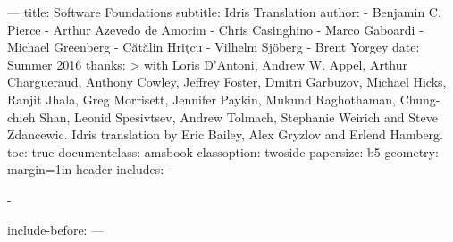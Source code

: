 ---
title: Software Foundations
subtitle: Idris Translation
author:
- Benjamin C. Pierce
- Arthur Azevedo de Amorim
- Chris Casinghino
- Marco Gaboardi
- Michael Greenberg
- Cătălin Hriţcu
- Vilhelm Sjöberg
- Brent Yorgey
date: Summer 2016
thanks: >
  with Loris D'Antoni, Andrew W. Appel, Arthur Chargueraud, Anthony Cowley,
  Jeffrey Foster, Dmitri Garbuzov, Michael Hicks, Ranjit Jhala, Greg Morrisett,
  Jennifer Paykin, Mukund Raghothaman, Chung-chieh Shan, Leonid Spesivtsev,
  Andrew Tolmach, Stephanie Weirich and Steve Zdancewic.\newline\newline
  Idris translation by Eric Bailey, Alex Gryzlov and Erlend Hamberg.
toc: true
documentclass: amsbook
classoption: twoside
papersize: b5
geometry: margin=1in
header-includes:
- \usepackage{minted}
- \usepackage{todonotes}
include-before: \frontmatter
---

\mainmatter
